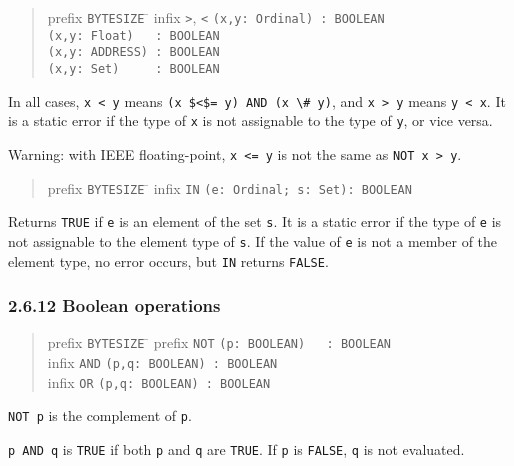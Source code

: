 \documentclass[10pt]{article}
\begin{document}
\begin{quote}
  \begin{tabbing}
    prefix \= \verb|BYTESIZE| \= \kill
    infix  \> \verb|>|, \verb|<| \> \verb|(x,y: Ordinal) : BOOLEAN| \\
           \>                    \> \verb|(x,y: Float)   : BOOLEAN| \\
           \>                    \> \verb|(x,y: ADDRESS) : BOOLEAN| \\
           \>                    \> \verb|(x,y: Set)     : BOOLEAN|
  \end{tabbing}
\end{quote}
In all cases, \verb|x < y| means \verb|(x $<$= y) AND (x \# y)|, and
\verb|x > y| means \verb|y < x|.  It is a static error if the type of \verb|x|
is not assignable to the type of \verb|y|, or vice versa.

Warning: with IEEE floating-point, \verb|x <= y| is not the same as
\verb|NOT x > y|.

\begin{quote}
  \begin{tabbing}
    prefix \= \verb|BYTESIZE| \= \kill
    infix  \> \verb|IN| \> \verb|(e: Ordinal; s: Set): BOOLEAN|
  \end{tabbing}
\end{quote}
Returns \verb|TRUE| if \verb|e| is an element of the set \verb|s|.  It is a
static error if the type of \verb|e| is not assignable to the element type of
\verb|s|.  If the value of \verb|e| is not a member of the element type, no
error occurs, but \verb|IN| returns \verb|FALSE|.

\subsubsection*{2.6.12 Boolean operations}

\begin{quote}
  \begin{tabbing}
    prefix \= \verb|BYTESIZE| \= \kill
    prefix \> \verb|NOT| \> \verb|(p: BOOLEAN)   : BOOLEAN| \\
     infix \> \verb|AND| \> \verb|(p,q: BOOLEAN) : BOOLEAN| \\
     infix \> \verb|OR|  \> \verb|(p,q: BOOLEAN) : BOOLEAN|
  \end{tabbing}
\end{quote}
\verb|NOT p| is the complement of \verb|p|.

\verb|p AND q| is \verb|TRUE| if both \verb|p| and \verb|q| are \verb|TRUE|.
If \verb|p| is \verb|FALSE|, \verb|q| is not evaluated.
\end{document}
